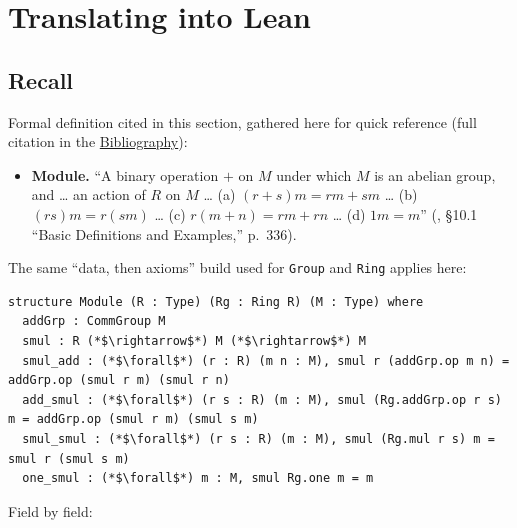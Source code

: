 \section{Translating into Lean}\label{sec:10-modules:02-translating-into-lean:1}

\subsection{Recall}\label{sec:10-modules:02-translating-into-lean:2}

Formal definition cited in this section, gathered here for quick reference (full citation in the \hyperref[sec:root:bibliography:1]{Bibliography}):

\begin{itemize}
\tightlist
\item
  \textbf{Module.} ``A binary operation \(+\) on \(M\) under which \(M\) is an abelian group, and \ldots{} an action of \(R\) on \(M\) \ldots{} (a) \((r+s)m = rm+sm\) \ldots{} (b) \((rs)m = r(sm)\) \ldots{} (c) \(r(m+n) = rm+rn\) \ldots{} (d) \(1m = m\)'' (\cite{DummitFoote2003}, §10.1 ``Basic Definitions and Examples,'' p.~336).
\end{itemize}

The same ``data, then axioms'' build used for \texttt{Group} and \texttt{Ring} applies here:

\begin{lstlisting}
structure Module (R : Type) (Rg : Ring R) (M : Type) where
  addGrp : CommGroup M
  smul : R (*$\rightarrow$*) M (*$\rightarrow$*) M
  smul_add : (*$\forall$*) (r : R) (m n : M), smul r (addGrp.op m n) = addGrp.op (smul r m) (smul r n)
  add_smul : (*$\forall$*) (r s : R) (m : M), smul (Rg.addGrp.op r s) m = addGrp.op (smul r m) (smul s m)
  smul_smul : (*$\forall$*) (r s : R) (m : M), smul (Rg.mul r s) m = smul r (smul s m)
  one_smul : (*$\forall$*) m : M, smul Rg.one m = m
\end{lstlisting}

Field by field:

